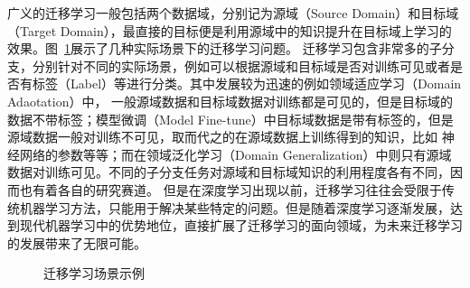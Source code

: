 广义的迁移学习一般包括两个数据域，分别记为源域（Source Domain）和目标域（Target Domain），最直接的目标便是利用源域中的知识提升在目标域上学习的效果。图~\ref{fig:transfer}展示了几种实际场景下的迁移学习问题。
迁移学习包含非常多的子分支，分别针对不同的实际场景，例如可以根据源域和目标域是否对训练可见或者是否有标签（Label）等进行分类。其中发展较为迅速的例如领域适应学习（Domain Adaotation）中，
一般源域数据和目标域数据对训练都是可见的，但是目标域的数据不带标签；模型微调（Model Fine-tune）中目标域数据是带有标签的，但是源域数据一般对训练不可见，取而代之的在源域数据上训练得到的知识，比如
神经网络的参数等等；而在领域泛化学习（Domain Generalization）中则只有源域数据对训练可见。不同的子分支任务对源域和目标域知识的利用程度各有不同，因而也有着各自的研究赛道。
但是在深度学习出现以前，迁移学习往往会受限于传统机器学习方法，只能用于解决某些特定的问题。但是随着深度学习逐渐发展，达到现代机器学习中的优势地位，直接扩展了迁移学习的面向领域，为未来迁移学习的发展带来了无限可能。

\begin{figure}
    \centering
    \caption{迁移学习场景示例}
    \label{fig:transfer}
\end{figure}
    

